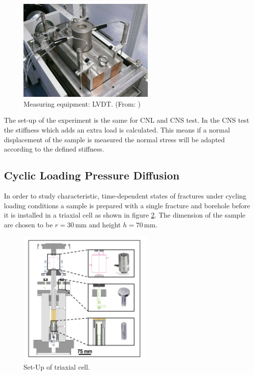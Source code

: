 \begin{figure}[!ht]
\begin{center}
\includegraphics[width=0.6\textwidth]{./figures/ExpCNLLVDT.jpg}
\end{center}
\caption{Measuring equipment: LVDT. (From: \cite{Nguyen2014})}
\label{fig:ExpCNLLVDT}
\end{figure}

The set-up of the experiment is the same for CNL and CNS test. In the CNS test the stiffness which adds an extra load is calculated. This means if a normal displacement of the sample is measured the normal stress will be adapted according to the defined stiffness.

\subsection{Cyclic Loading Pressure Diffusion}

In order to study characteristic, time-dependent states of fractures under cycling loading conditions a sample is prepared with a single fracture and borehole before it is installed in a triaxial cell as shown in figure \ref{fig:exp_cyclic_pressure_triax}. The dimension of the sample are chosen to be $r=30 \, \text{mm}$ and height $h=70 \, \text{mm}$. 

\begin{figure}[!ht]
\begin{center}
\includegraphics[width=0.6\textwidth]{./figures/exp_cyclic_pressure_triax.png}
\end{center}
\caption{Set-Up of triaxial cell.}
\label{fig:exp_cyclic_pressure_triax}
\end{figure}


